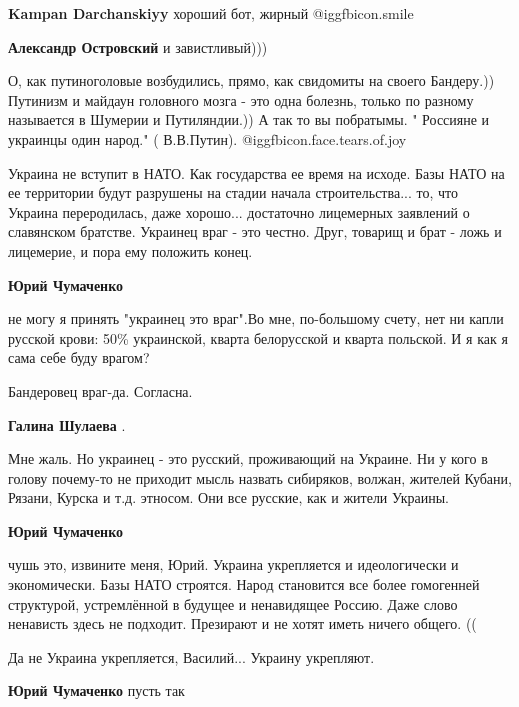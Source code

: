 \begin{itemize}
\begin{itemize} %
\textbf{Kampan Darchanskiyy} хороший бот, жирный  @igg{fbicon.smile} 

\textbf{Александр Островский} и завистливый)))


О, как путиноголовые возбудились, прямо, как свидомиты на своего Бандеру.))
Путинизм и майдаун головного мозга - это одна болезнь, только по разному
называется в Шумерии и Путиляндии.)) А так то вы побратымы. " Россияне и
украинцы один народ." ( В.В.Путин).  @igg{fbicon.face.tears.of.joy} 

\end{itemize} %


Украина не вступит в НАТО. Как государства ее время на исходе. Базы НАТО на ее
территории будут разрушены на стадии начала строительства... то, что Украина
переродилась, даже хорошо... достаточно лицемерных заявлений о славянском
братстве. Украинец враг - это честно. Друг, товарищ и брат - ложь и лицемерие,
и пора ему положить конец.

\begin{itemize} %
\textbf{Юрий Чумаченко} 

не могу я принять "украинец это враг".Во мне, по-большому счету, нет ни капли
русской крови: 50\% украинской, кварта белорусской и кварта польской. И я как я
сама себе буду врагом?

Бандеровец враг-да. Согласна.

\textbf{Галина Шулаева} . 

Мне жаль. Но украинец - это русский, проживающий на Украине. Ни у кого в голову
почему-то не приходит мысль назвать сибиряков, волжан, жителей Кубани, Рязани,
Курска и т.д. этносом. Они все русские, как и жители Украины.


\textbf{Юрий Чумаченко} 

чушь это, извините меня, Юрий. Украина укрепляется и идеологически и
экономически. Базы НАТО строятся. Народ становится все более гомогенней
структурой, устремлённой в будущее и ненавидящее Россию. Даже слово ненависть
здесь не подходит. Презирают и не хотят иметь ничего общего. ((

Да не Украина укрепляется, Василий... Украину укрепляют.

\textbf{Юрий Чумаченко} пусть так


\end{itemize}
\end{itemize}

